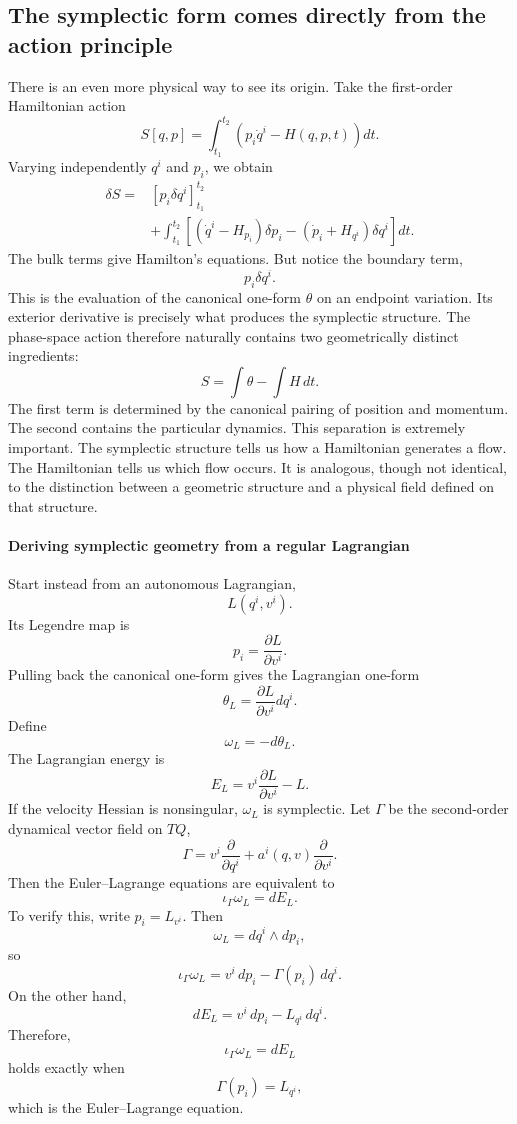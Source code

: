 \subsection{The symplectic form comes directly from the action principle}
There is an even more physical way to see its origin.
Take the first-order Hamiltonian action
\[
\boxed{
S[q,p]=\int_{t_1}^{t_2}
\left(p_i\dot q^i-H(q,p,t)\right)dt.
}
\]
Varying independently \(q^i\) and \(p_i\), we obtain
\[
\begin{aligned}
\delta S
={}&[p_i\delta q^i]_{t_1}^{t_2}\\
&+\int_{t_1}^{t_2}
\left[
(\dot q^i-H_{p_i})\delta p_i
-(\dot p_i+H_{q^i})\delta q^i
\right]dt.
\end{aligned}
\]
The bulk terms give Hamilton's equations.
But notice the boundary term,
\[
\boxed{p_i\delta q^i.}
\]
This is the evaluation of the canonical one-form \(\theta\) on an endpoint
variation.
Its exterior derivative is precisely what produces the symplectic structure.
The phase-space action therefore naturally contains two geometrically distinct
ingredients:
\[
\boxed{
S=\int\theta-\int H\,dt.
}
\]
The first term is determined by the canonical pairing of position and momentum.
The second contains the particular dynamics.
This separation is extremely important.
The symplectic structure tells us how a Hamiltonian generates a flow. The
Hamiltonian tells us which flow occurs.
It is analogous, though not identical, to the distinction between a geometric
structure and a physical field defined on that structure.

\paragraph{Deriving symplectic geometry from a regular Lagrangian}
Start instead from an autonomous Lagrangian,
\[
L(q^i,v^i).
\]
Its Legendre map is
\[
p_i=\frac{\partial L}{\partial v^i}.
\]
Pulling back the canonical one-form gives the Lagrangian one-form
\[
\boxed{
\theta_L=
\frac{\partial L}{\partial v^i}dq^i.
}
\]
Define
\[
\boxed{\omega_L=-d\theta_L.}
\]
The Lagrangian energy is
\[
\boxed{
E_L=v^i\frac{\partial L}{\partial v^i}-L.
}
\]
If the velocity Hessian is nonsingular, \(\omega_L\) is symplectic.
Let \(\Gamma\) be the second-order dynamical vector field on \(TQ\),
\[
\Gamma=v^i\frac{\partial}{\partial q^i}
+a^i(q,v)\frac{\partial}{\partial v^i}.
\]
Then the Euler–Lagrange equations are equivalent to
\[
\boxed{\iota_\Gamma\omega_L=dE_L.}
\]
To verify this, write \(p_i=L_{v^i}\). Then
\[
\omega_L=dq^i\wedge dp_i,
\]
so
\[
\iota_\Gamma\omega_L
=v^i\,dp_i-\Gamma(p_i)\,dq^i.
\]
On the other hand,
\[
dE_L=v^i\,dp_i-L_{q^i}\,dq^i.
\]
Therefore,
\[
\iota_\Gamma\omega_L=dE_L
\]
holds exactly when
\[
\Gamma(p_i)=L_{q^i},
\]
which is the Euler–Lagrange equation.


